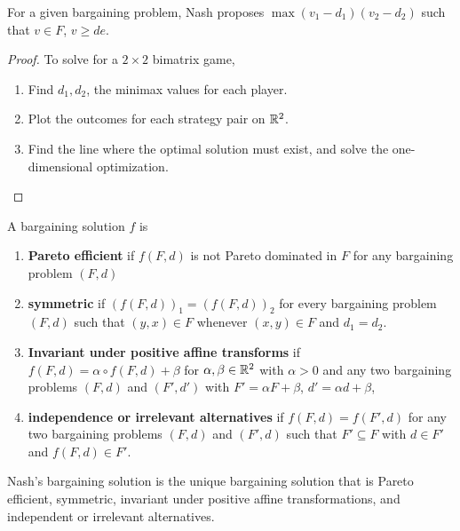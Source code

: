 \begin{thm}
  \label{sec:bargaining-2}
  For a given bargaining problem, Nash proposes $\max (v_{1} -
  d_{1})(v_{2} - d_{2})$ such that $v \in F$, $v \geq de$.
\end{thm}

\begin{proof}
  To solve for a $2 \times 2$ bimatrix game,
  \begin{enumerate}
  \item Find $d_{1}, d_{2}$, the minimax values for each player.
  \item Plot the outcomes for each strategy pair on $\mathbb{R}^{2}$.
  \item Find the line where the optimal solution must exist, and solve
    the one-dimensional optimization.
  \end{enumerate}
\end{proof}

\begin{defn}
  \label{sec:bargaining-3}
  A bargaining solution $f$ is
  \begin{enumerate}
  \item \textbf{Pareto efficient} if $f(F, d)$ is not Pareto dominated
    in $F$ for any bargaining problem $(F, d)$
  \item \textbf{symmetric} if $(f(F, d))_{1} = (f(F, d))_{2}$ for
    every bargaining problem $(F, d)$ such that $(y, x) \in F$
    whenever $(x, y) \in F$ and $d_{1} = d_{2}$.
  \item \textbf{Invariant under positive affine transforms} if $f(F, d) =
    \alpha \circ f(F, d) + \beta$ for $\alpha, \beta \in \mathbb{R}^{2}$ with
    $\alpha > 0$ and any two bargaining problems $(F, d)$ and $(F',
    d')$ with $F' = \alpha F + \beta$, $d' = \alpha d + \beta$,
  \item \textbf{independence or irrelevant alternatives} if $f(F, d) =
    f(F', d)$ for any two bargaining problems $(F, d)$ and $(F', d)$
    such that $F' \subseteq F$ with $d \in F'$ and $f(F, d) \in F'$.
  \end{enumerate}
\end{defn}

\begin{thm}
  \label{sec:bargaining-4}
  Nash's bargaining solution is the unique bargaining solution that is
  Pareto efficient, symmetric, invariant under positive affine
  transformations, and independent or irrelevant alternatives.
\end{thm}


